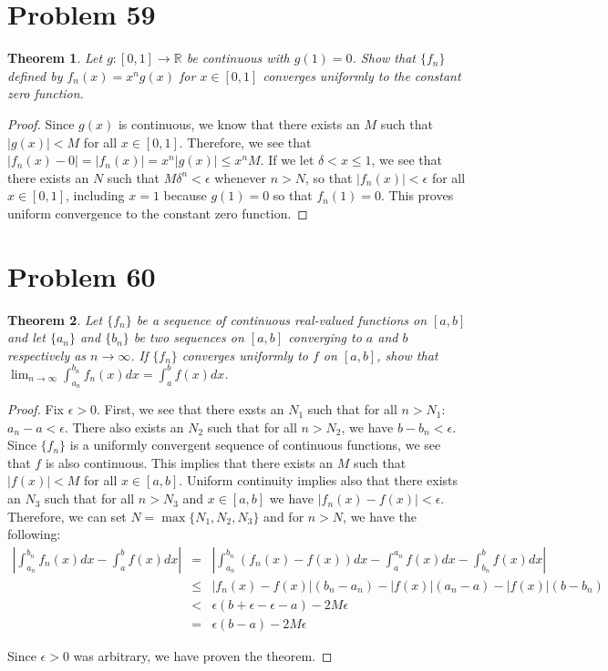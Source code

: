 \documentclass[psamsfonts]{amsart}
\newtheorem{thm}{Theorem}[section]
\theoremstyle{definition}
\theoremstyle{remark}
\numberwithin{equation}{section}
\begin{document}
\section{Problem 59}

\begin{thm}
Let $g:[0,1] \to \mathbb{R}$ be continuous with $g(1) = 0$. Show that $\{ f_n \}$ defined by $f_n(x) = x^n g(x)$ for $x \in [0,1]$ converges uniformly to the constant zero function.
\end{thm}

\begin{proof}
Since $g(x)$ is continuous, we know that there exists an $M$ such that $|g(x)| < M$ for all $x \in [0,1]$. Therefore, we see that $|f_n(x) - 0| = |f_n(x)| = x^n |g(x)| \leq x^n M$. If we let $\delta < x \leq 1$, we see that there exists an $N$ such that $M \delta^n < \epsilon$ whenever $n > N$, so that $|f_n(x)| < \epsilon$ for all $x \in [0,1]$, including $x=1$ because $g(1) = 0$ so that $f_n(1) = 0$. This proves uniform convergence to the constant zero function.
\end{proof}

\section{Problem 60}

\begin{thm}
Let $\{ f_n \}$ be a sequence of continuous real-valued functions on $[a,b]$ and let $\{a_n \}$ and $\{b_n\}$ be two sequences on $[a,b]$ converging to $a$ and $b$ respectively as $n \to \infty$. If $\{ f_n \}$ converges uniformly to $f$ on $[a,b]$, show that $\lim_{n \to \infty} \int_{a_n}^{b_n} f_n(x) dx = \int_a^b f(x) dx$. 
\end{thm}

\begin{proof}
Fix $\epsilon > 0$. First, we see that there exsts an $N_1$ such that for all $n > N_1$: $a_n - a < \epsilon$. There also exists an $N_2$ such that for all $n > N_2$, we have $b - b_n < \epsilon$. Since $\{ f_n \}$ is a uniformly convergent sequence of continuous functions, we see that $f$ is also continuous. This implies that there exists an $M$ such that $|f(x)| < M$ for all $x \in [a,b]$. Uniform continuity implies also that there exists an $N_3$ such that for all $n > N_3$ and $x \in [a,b]$ we have $|f_n(x) - f(x) | < \epsilon$.  Therefore, we can set $N = \max \{N_1, N_2, N_3 \}$ and for $n > N$, we have the following:
\begin{eqnarray}
\left| \int_{a_n}^{b_n} f_n(x) dx - \int_a^b f(x) dx \right| &=& \left| \int_{a_n}^{b_n} (f_n(x) - f(x)) dx - \int_{a}^{a_n} f(x) dx - \int_{b_n}^b f(x) dx \right| \\
&\leq& | f_n(x) - f(x)| (b_n - a_n) - |f(x)| (a_n - a) - |f(x)| (b - b_n) \\
&<& \epsilon (b + \epsilon - \epsilon - a) - 2 M \epsilon \\
&=& \epsilon (b -a) - 2M \epsilon
\end{eqnarray} 

Since $\epsilon > 0$ was arbitrary, we have proven the theorem.
\end{proof}
\end{document}
